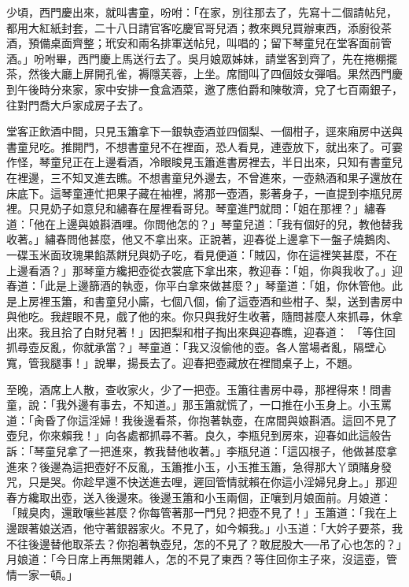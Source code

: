 少頃，西門慶出來，就叫書童，吩咐：「在家，別往那去了，先寫十二個請帖兒，都用大紅紙封套，二十八日請官客吃慶官哥兒酒；教來興兒買辦東西，添廚役茶酒，預備桌面齊整；玳安和兩名排軍送帖兒，叫唱的；留下琴童兒在堂客面前管酒。」吩咐畢，西門慶上馬送行去了。吳月娘眾姊妹，請堂客到齊了，先在捲棚擺茶，然後大廳上屏開孔雀，褥隱芙蓉，上坐。席間叫了四個妓女彈唱。果然西門慶到午後時分來家，家中安排一食盒酒菜，邀了應伯爵和陳敬濟，兌了七百兩銀子，往對門喬大戶家成房子去了。

堂客正飲酒中間，只見玉簫拿下一銀執壺酒並四個梨、一個柑子，逕來廂房中送與書童兒吃。推開門，不想書童兒不在裡面，恐人看見，連壺放下，就出來了。可霎作怪，琴童兒正在上邊看酒，冷眼睃見玉簫進書房裡去，半日出來，只知有書童兒在裡邊，三不知叉進去瞧。不想書童兒外邊去，不曾進來，一壺熱酒和果子還放在床底下。這琴童連忙把果子藏在袖裡，將那一壺酒，影著身子，一直提到李瓶兒房裡。只見奶子如意兒和繡春在屋裡看哥兒。琴童進門就問：「姐在那裡？」繡春道：「他在上邊與娘斟酒哩。你問他怎的？」琴童兒道：「我有個好的兒，教他替我收著。」繡春問他甚麼，他又不拿出來。正說著，迎春從上邊拿下一盤子燒鵝肉、一碟玉米面玫瑰果餡蒸餅兒與奶子吃，看見便道：「賊囚，你在這裡笑甚麼，不在上邊看酒？」那琴童方纔把壺從衣裳底下拿出來，教迎春：「姐，你與我收了。」迎春道：「此是上邊篩酒的執壺，你平白拿來做甚麼？」琴童道：「姐，你休管他。此是上房裡玉簫，和書童兒小廝，七個八個，偷了這壺酒和些柑子、梨，送到書房中與他吃。我趕眼不見，戲了他的來。你只與我好生收著，隨問甚麼人來抓尋，休拿出來。我且拾了白財兒著！」因把梨和柑子掏出來與迎春瞧，迎春道： 「等住回抓尋壺反亂，你就承當？」琴童道：「我又沒偷他的壺。各人當場者亂，隔壁心寬，管我腿事！」說畢，揚長去了。迎春把壺藏放在裡間桌子上，不題。

至晚，酒席上人散，查收家火，少了一把壺。玉簫往書房中尋，那裡得來！問書童，說：「我外邊有事去，不知道。」那玉簫就慌了，一口推在小玉身上。小玉罵道：「肏昏了你這淫婦！我後邊看茶，你抱著執壺，在席間與娘斟酒。這回不見了壺兒，你來賴我！」向各處都抓尋不著。良久，李瓶兒到房來，迎春如此這般告訴：「琴童兒拿了一把進來，教我替他收著。」李瓶兒道：「這囚根子，他做甚麼拿進來？後邊為這把壺好不反亂，玉簫推小玉，小玉推玉簫，急得那大丫頭賭身發咒，只是哭。你趁早還不快送進去哩，遲回管情就賴在你這小淫婦兒身上。」那迎春方纔取出壺，送入後邊來。後邊玉簫和小玉兩個，正嚷到月娘面前。月娘道：「賊臭肉，還敢嚷些甚麼？你每管著那一門兒？把壺不見了！」玉簫道：「我在上邊跟著娘送酒，他守著銀器家火。不見了，如今賴我。」小玉道：「大妗子要茶，我不往後邊替他取茶去？你抱著執壺兒，怎的不見了？敢屁股大──吊了心也怎的？」月娘道：「今日席上再無閑雜人，怎的不見了東西？等住回你主子來，沒這壺，管情一家一頓。」

